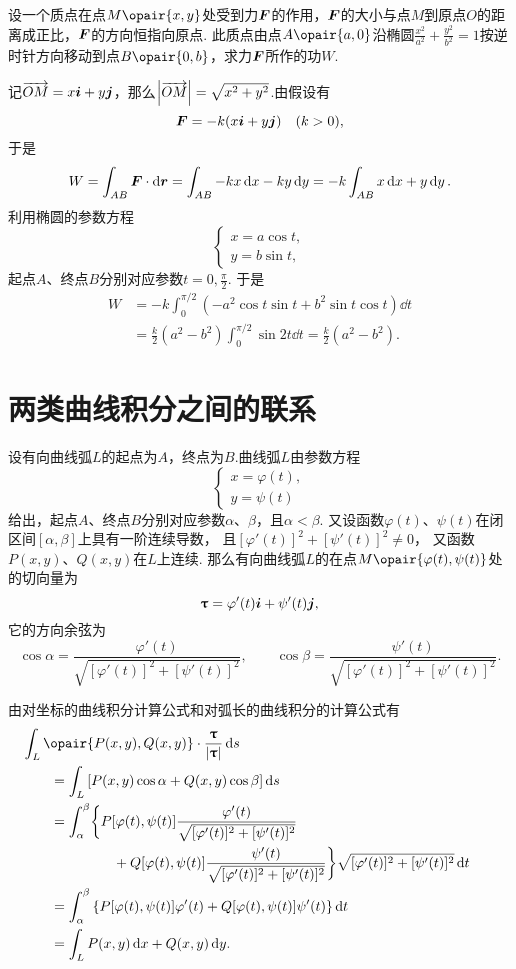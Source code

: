 \begin{example}
设一个质点在点\(M\opair{x,y}\)处受到力\(\boldsymbol{F}\)的作用，\(\boldsymbol{F}\)的大小与点\(M\)到原点\(O\)的距离成正比，\(\boldsymbol{F}\)的方向恒指向原点.
此质点由点\(A\opair{a,0}\)沿椭圆\(\frac{x^2}{a^2}+\frac{y^2}{b^2}=1\)按逆时针方向移动到点\(B\opair{0,b}\)，求力\(\boldsymbol{F}\)所作的功\(W\).
\begin{solution}
记\(\overrightarrow{OM} = x\boldsymbol{i}+y\boldsymbol{j}\)，那么\(\abs{\overrightarrow{OM}} = \sqrt{x^2+y^2}\).由假设有\[
\boldsymbol{F} = -k(x\boldsymbol{i}+y\boldsymbol{j}) \quad (k>0),
\]于是\[
W = \int_{AB} \boldsymbol{F} \cdot \dd\boldsymbol{r}
= \int_{AB} -kx\dd{x}-ky\dd{y}
= -k \int_{AB} x\dd{x}+y\dd{y}.
\]利用椭圆的参数方程\[
\begin{cases}
x = a \cos t, \\
y = b \sin t,
\end{cases}
\]起点\(A\)、终点\(B\)分别对应参数\(t = 0,\frac{\pi}{2}\).
于是\begin{align*}
W &= -k \int_0^{\pi/2} (-a^2 \cos t \sin t + b^2 \sin t \cos t) \dd{t} \\
&= \frac{k}{2}(a^2-b^2) \int_0^{\pi/2} \sin 2t \dd{t}
= \frac{k}{2}(a^2-b^2).
\end{align*}
\end{solution}
\end{example}

\section{两类曲线积分之间的联系}
\begingroup
\def\lenTau{\sqrt{[\varphi'(t)]^2+[\psi'(t)]^2}}
\def\fTau#1{\frac{#1}{\lenTau}}
\def\funcParam{[\varphi(t),\psi(t)]}

设有向曲线弧\(L\)的起点为\(A\)，终点为\(B\).曲线弧\(L\)由参数方程\[
\begin{cases}
x = \varphi(t), \\
y = \psi(t)
\end{cases}
\]给出，起点\(A\)、终点\(B\)分别对应参数\(\alpha\)、\(\beta\)，且\(\alpha < \beta\).
又设函数\(\varphi(t)\)、\(\psi(t)\)在闭区间\([\alpha,\beta]\)上具有一阶连续导数，%
且\([\varphi'(t)]^2+[\psi'(t)]^2 \neq 0\)，%
又函数\(P(x,y)\)、\(Q(x,y)\)在\(L\)上连续.
那么有向曲线弧\(L\)的在点\(M\opair{\varphi(t),\psi(t)}\)处的切向量为\[
\boldsymbol{\uptau} = \varphi'(t) \boldsymbol{i} + \psi'(t) \boldsymbol{j},
\]它的方向余弦为\[
\cos\alpha=\fTau{\varphi'(t)},
\qquad
\cos\beta=\fTau{\psi'(t)}.
\]

由对坐标的曲线积分计算公式和对弧长的曲线积分的计算公式有
\begin{align*}
&\hspace{-20pt}\int_L{\opair{P(x,y),Q(x,y)}\cdot\frac{\mat{\tau}}{\abs{\mat{\tau}}}\dd{s}} \\
&=\int_L{[P(x,y)\cos\alpha+Q(x,y)\cos\beta]\dd{s}} \\
&=\int_{\alpha}^{\beta} \biggl\{ {P\funcParam\fTau{\varphi'(t)}} \\
	&\hspace{45pt}+{Q\funcParam\fTau{\psi'(t)}} \biggr\} \lenTau \dd{t} \\
&=\int_{\alpha}^{\beta} \left\{
		P\funcParam\varphi'(t) + Q\funcParam\psi'(t)
	\right\} \dd{t} \\
&=\int_L{P(x,y)\dd{x}+Q(x,y)\dd{y}}.
\end{align*}
\endgroup


